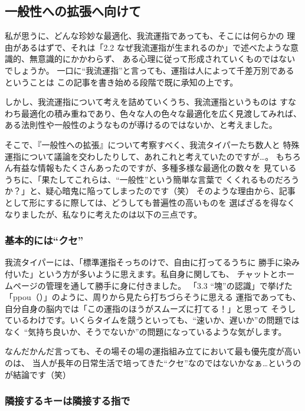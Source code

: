 \subsection{一般性への拡張へ向けて}

私が思うに、どんな珍妙な最適化、我流運指であっても、そこには何らかの
理由があるはずで、それは「2.2 なぜ我流運指が生まれるのか」で述べたような意識的、無意識的にかかわらず、
ある心理に従って形成されていくものではないでしょうか。
一口に“我流運指”と言っても、運指は人によって千差万別であるということは
この記事を書き始める段階で既に承知の上です。

しかし、我流運指について考えを詰めていくうち、我流運指というものは
すなわち最適化の積み重ねであり、色々な人の色々な最適化を広く見渡してみれば、
ある法則性や一般性のようなものが導けるのではないか、と考えました。


そこで、『一般性への拡張』について考察すべく、我流タイパーたち数人と
特殊運指について議論を交わしたりして、あれこれと考えていたのですが…。
もちろん有益な情報もたくさんあったのですが、多種多様な最適化の数々を
見ているうちに、「果たしてこれらは、“一般性”という簡単な言葉で
くくれるものだろうか？」と、疑心暗鬼に陥ってしまったのです（笑）
そのような理由から、記事として形にするに際しては、どうしても普遍性の高いものを
選ばざるを得なくなりましたが、私なりに考えたのは以下の三点です。


\subsubsection*{基本的には“クセ”}

我流タイパーには、「標準運指そっちのけで、自由に打ってるうちに
勝手に染み付いた」という方が多いように思えます。私自身に関しても、
チャットとホームページの管理を通して勝手に身に付きました。
「3.3 “塊”の認識」で挙げた「ppou（）」のように、周りから見たら打ちづらそうに思える
運指であっても、自分自身の脳内では「この運指のほうがスムーズに打てる！」と思って
そうしているわけです。いくらタイムを競うといっても、“速いか、遅いか”の問題ではなく
“気持ち良いか、そうでないか”の問題になっているような気がします。

なんだかんだ言っても、その場その場の運指組み立てにおいて最も優先度が高いのは、
当人が長年の日常生活で培ってきた“クセ”なのではないかなぁ…というのが結論です（笑）


\subsubsection*{隣接するキーは隣接する指で}

